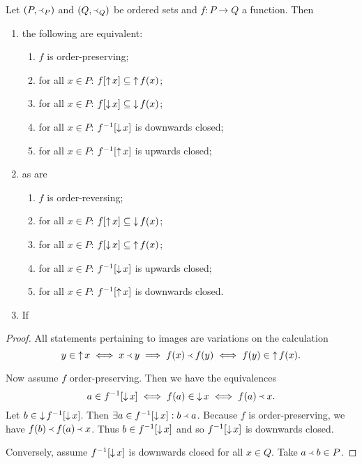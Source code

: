 \begin{lemma}
Let $(P, \Yleft_P)$ and $(Q, \Yleft_Q)$ be ordered sets and $f: P\to Q$ a function. Then
\begin{enumerate}
\item the following are equivalent:
\begin{enumerate}
\item $f$ is order-preserving;
\item for all $x\in P$: $f[\mathop{\uparrow} x] \subseteq \mathop{\uparrow} f(x)$;
\item for all $x\in P$: $f[\mathop{\downarrow} x] \subseteq \mathop{\downarrow} f(x)$;
\item for all $x\in P$: $f^{-1}[\mathop{\downarrow} x]$ is downwards closed;
\item for all $x\in P$: $f^{-1}[\mathop{\uparrow} x]$ is upwards closed;
\end{enumerate}
\item as are
\begin{enumerate}
\item $f$ is order-reversing;
\item for all $x\in P$: $f[\mathop{\uparrow} x] \subseteq \mathop{\downarrow} f(x)$;
\item for all $x\in P$: $f[\mathop{\downarrow} x] \subseteq \mathop{\uparrow} f(x)$;
\item for all $x\in P$: $f^{-1}[\mathop{\downarrow} x]$ is upwards closed;
\item for all $x\in P$: $f^{-1}[\mathop{\uparrow} x]$ is downwards closed.
\end{enumerate}
\item If 
\end{enumerate}
\end{lemma}
\begin{proof}
All statements pertaining to images are variations on the calculation
\[ y\in \mathop{\uparrow} x \iff x\Yleft y \implies f(x) \Yleft f(y) \iff f(y) \in \mathop{\uparrow} f(x). \]

Now assume $f$ order-preserving. Then we have the equivalences
\[ a\in f^{-1}[\mathop{\downarrow} x] \iff f(a) \in \mathop{\downarrow} x \iff f(a) \Yleft x. \]
Let $b \in \mathop{\downarrow} f^{-1}[\mathop{\downarrow} x]$. Then $\exists a \in f^{-1}[\mathop{\downarrow} x]: b \Yleft a$. Because $f$ is order-preserving, we have $f(b) \Yleft f(a) \Yleft x$. Thus $b \in f^{-1}[\mathop{\downarrow} x]$ and so $f^{-1}[\mathop{\downarrow} x]$ is downwards closed.

Conversely, assume $f^{-1}[\mathop{\downarrow} x]$ is downwards closed for all $x\in Q$. Take $a \Yleft b \in P$.
\end{proof}
